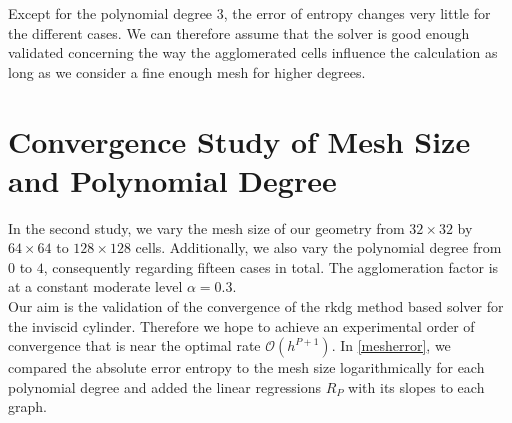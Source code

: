 	Except for the polynomial degree $3$, the error of entropy changes very little for the different cases. We can therefore assume that the solver is good enough validated concerning the way the agglomerated cells influence the calculation as long as we consider a fine enough mesh for higher degrees.
	
	\section{Convergence Study of Mesh Size and Polynomial Degree}
	
	In the second study, we vary the mesh size of our geometry from $32 \times 32$ by $64 \times 64$ to $128 \times 128$ cells. Additionally, we also vary the polynomial degree from $0$ to $4$, consequently regarding fifteen cases in total. The agglomeration factor is at a constant moderate level $\alpha = 0.3$.\\
	Our aim is the validation of the convergence of the \gls{rkdg} method based solver for the inviscid cylinder. Therefore we hope to achieve an experimental order of convergence that is near the optimal rate $\mathcal{O}(h^{P+1})$. In  \cref{mesherror}, we compared the absolute error entropy to the mesh size logarithmically for each polynomial degree and added the linear regressions $R_P$ with its slopes to each graph. \\
